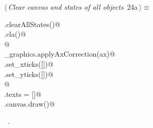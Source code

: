 \documentclass[11.5pt]{report}
\begin{document}
\begin{flushleft} \small\label{scrap16}\raggedright\small
{} $\langle\,${\itshape Clear canvas and states of all objects}\nobreak\ {\footnotesize {24a}}$\,\rangle\equiv$
\vspace{-1ex}
\begin{list}{}{} \item
\mbox{}\verb@run.clearAllStates()@\\
\mbox{}\verb@ax.cla()@\\
\mbox{}\verb@              @\\
\mbox{}\verb@utils_graphics.applyAxCorrection(ax)@\\
\mbox{}\verb@ax.set_xticks([])@\\
\mbox{}\verb@ax.set_yticks([])@\\
\mbox{}\verb@                 @\\
\mbox{}\verb@fig.texts = []@\\
\mbox{}\verb@fig.canvas.draw()@\\
\mbox{}\verb@@{\NWsep}
\end{list}
\vspace{-1.5ex}
\footnotesize
\begin{list}{}{\setlength{\itemsep}{-\parsep}\setlength{\itemindent}{-\leftmargin}}
\item \NWtxtMacroRefIn\ .

\item{}
\end{list}
\vspace{4ex}
\end{flushleft}
\newchunk 
\end{document}
